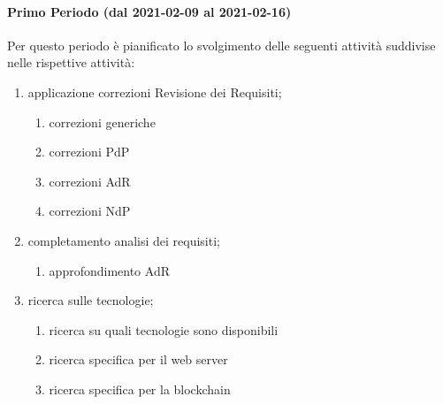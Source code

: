 \paragraph{Primo Periodo (dal 2021-02-09 al 2021-02-16)}
Per questo periodo è pianificato lo svolgimento delle seguenti attività suddivise nelle rispettive attività:
\begin{enumerate}
	\item applicazione correzioni Revisione dei Requisiti;
	\begin{enumerate}
		\item correzioni generiche
		\item correzioni PdP
		\item correzioni AdR
		\item correzioni NdP
	\end{enumerate}
	\item completamento analisi dei requisiti;
	\begin{enumerate}
		\item approfondimento AdR
	\end{enumerate}
	\item ricerca sulle tecnologie;
	\begin{enumerate}
		\item ricerca su quali tecnologie sono disponibili
		\item ricerca specifica per il web server
		\item ricerca specifica per la blockchain
	\end{enumerate}
\end{enumerate}



